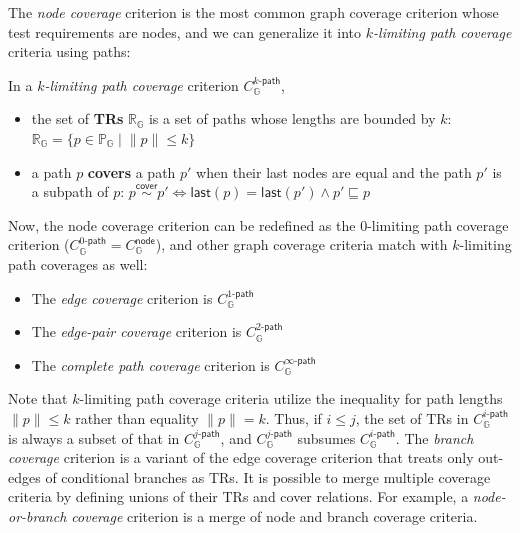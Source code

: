 \documentclass[acmsmall,review,screen]{acmart}
\newcommand{\name}[1]{\textsf{#1}}
\newcommand{\graph}{\mathbb{G}}
\newcommand{\patset}[1]{\mathbb{P}_{#1}}
\newcommand{\pat}{p}
\newcommand{\getlast}{\name{last}}
\newcommand{\subpath}{\sqsubseteq}
\newcommand{\cover}{\overset{\name{cover}}{\sim}}
\newcommand{\trset}[1]{\mathbb{R}_{#1}}
\newcommand{\cov}[1]{C_{#1}}
\newcommand{\nodecov}[1]{\cov{#1}^{\name{node}}}
\newcommand{\kpathcov}[2]{\cov{#2}^{{#1}\name{-path}}}
\newcommand{\norm}[1]{\lVert{#1}\rVert}
\begin{document}

The \textit{node coverage} criterion is the most common graph coverage criterion
whose test requirements are nodes, and we can generalize it into
\textit{$k$-limiting path coverage} criteria using paths:


\begin{definition}\label{def:k-path-cov}
  In a \textit{$k$-limiting path coverage} criterion $\kpathcov{k}{\graph}$,
  \begin{itemize}
    \item the set of \textbf{TRs} $\trset{\graph}$ is a set of
      paths whose lengths are bounded by $k$:
$
        \trset{\graph} = \{ \pat \in \patset{\graph} \mid \norm{\pat} \leq k \}
$
    \item a path $\pat$ \textbf{covers} a path $\pat'$ when their last nodes are
      equal and the path $\pat'$ is a subpath of $\pat$:
$
        \pat \cover \pat'
        \iff
        \getlast(\pat) = \getlast(\pat') \wedge \pat' \subpath \pat
$
  \end{itemize}
\end{definition}


Now, the node coverage criterion can be redefined as the 0-limiting path
coverage criterion ($\kpathcov{0}{\graph} = \nodecov{\graph}$), and other graph
coverage criteria match with $k$-limiting path coverages as well:
\begin{itemize}
  \item The \textit{edge coverage} criterion is $\kpathcov{1}{\graph}$
  \item The \textit{edge-pair coverage} criterion is $\kpathcov{2}{\graph}$
  \item The \textit{complete path coverage} criterion is
    $\kpathcov{\infty}{\graph}$
\end{itemize}
%
Note that $k$-limiting path coverage criteria utilize the inequality for path
lengths $\norm{\pat} \leq k$ rather than equality $\norm{\pat} = k$.
%
Thus, if $i \leq j$, the set of TRs in $\kpathcov{i}{\graph}$ is always a subset
of that in $\kpathcov{j}{\graph}$, and $\kpathcov{j}{\graph}$ subsumes
$\kpathcov{i}{\graph}$.
%
The \textit{branch coverage} criterion is a variant of the edge coverage
criterion that treats only out-edges of conditional branches as TRs.
%
It is possible to merge multiple coverage criteria by defining unions of their
TRs and cover relations.
%
For example, a \textit{node-or-branch coverage} criterion is a merge
of node and branch coverage criteria.
\end{document}
